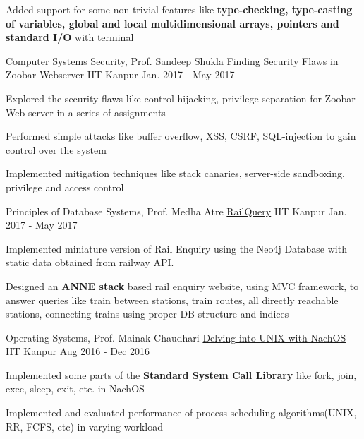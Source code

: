 \begin{cventries}
{\begin{cvitems}
        \item {Added support for some non-trivial features like \textbf{type-checking, type-casting of variables, global and local multidimensional arrays, pointers and standard I/O} with terminal}
      \end{cvitems}
    }
  \cventry
    {Computer Systems Security, Prof. Sandeep Shukla}
    {Finding Security Flaws in Zoobar Webserver}
    {IIT Kanpur}
    {Jan. 2017 - May 2017}
    {
      \begin{cvitems}
        \item {Explored the security flaws like control hijacking, privilege separation for Zoobar Web server in a series of assignments}
        \item {Performed simple attacks like buffer overflow, XSS, CSRF, SQL-injection to gain control over the system}
        \item {Implemented mitigation techniques like stack canaries, server-side sandboxing, privilege and access control}
      \end{cvitems}
    }
  \cventry
    {Principles of Database Systems, Prof. Medha Atre}
    {\href{https://github.com/tulsyan/railquery}{RailQuery}}
    {IIT Kanpur}
    {Jan. 2017 - May 2017}
    {
      \begin{cvitems}
        \item {Implemented miniature version of Rail Enquiry using the Neo4j Database with static data obtained from railway API.}
        \item {Designed an \textbf{ANNE stack} based rail enquiry website, using MVC framework, to answer queries like train between stations, train routes, all directly reachable stations, connecting trains using proper DB structure and indices}
      \end{cvitems}
    }
  \cventry
    {Operating Systems, Prof. Mainak Chaudhari}
    {\href{https://bitbucket.org/arhamchopra11/nachos-assignments}{Delving into UNIX with NachOS}}
    {IIT Kanpur}
    {Aug 2016 - Dec 2016}
    {
      \begin{cvitems}
        \item {Implemented some parts of the \textbf{Standard System Call Library} like fork, join, exec, sleep, exit, etc. in NachOS}
        \item {Implemented and evaluated performance of process scheduling algorithms(UNIX, RR, FCFS, etc) in varying workload}

\end{cvitems}}
\end{cventries}
